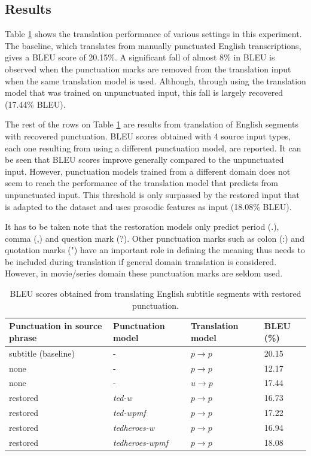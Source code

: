 \subsection*{Results}

Table \ref{table:punkEffect} shows the translation performance of various settings in this experiment. The baseline, which translates from manually punctuated English transcriptions, gives a BLEU score of 20.15\%. A significant fall of almost 8\% in BLEU is observed when the punctuation marks are removed from the translation input when the same translation model is used. Although, through using the translation model that was trained on unpunctuated input, this fall is largely recovered (17.44\% BLEU). 

The rest of the rows on Table \ref{table:punkEffect} are results from translation of English segments with recovered punctuation. BLEU scores obtained with 4 source input types, each one resulting from using a different punctuation model, are reported. It can be seen that BLEU scores improve generally compared to the unpunctuated input. However, punctuation models trained from a different domain does not seem to reach the performance of the translation model that predicts from unpunctuated input. This threshold is only surpassed by the restored input that is adapted to the dataset and uses prosodic features as input (18.08\% BLEU). 

It has to be taken note that the restoration models only predict period (.), comma (,) and question mark (?). Other punctuation marks such as colon (:) and quotation marks (") have an important role in defining the meaning thus needs to be included during translation if general domain translation is considered. However, in movie/series domain these punctuation marks are seldom used. 

\begin{table}[!tbp]
\begin{tabular}{p{4cm}p{3cm}ll}
\toprule
\textbf{Punctuation in source phrase} & \textbf{Punctuation model} & \textbf{Translation model} & \textbf{BLEU (\%)}\\
\midrule
subtitle (baseline) & -                       & $ p \rightarrow p $   & 20.15  \\
none                & -                       & $ p \rightarrow p $   & 12.17  \\
none                & -                       & $ u \rightarrow p $   & 17.44  \\
restored            & \textit{ted-w}          & $ p \rightarrow p $   & 16.73  \\
restored            & \textit{ted-wpmf}       & $ p \rightarrow p $   & 17.22  \\
restored            & \textit{tedheroes-w}    & $ p \rightarrow p $   & 16.94  \\
restored            & \textit{tedheroes-wpmf} & $ p \rightarrow p $   & 18.08  \\
\bottomrule
\end{tabular}
\caption{BLEU scores obtained from translating English subtitle segments with restored punctuation.}
\label{table:punkEffect}
\end{table}

